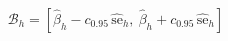 \par\needspace{88pt}\begin{minipage}{\linewidth}
\begin{equation}\mathcal{B}_h=\left[\hat\beta_h-c_{0.95}\,\widehat{\mathrm{se}}_h,\ \hat\beta_h+c_{0.95}\,\widehat{\mathrm{se}}_h\right]\label{eq:13}\end{equation}
\end{minipage}\par
